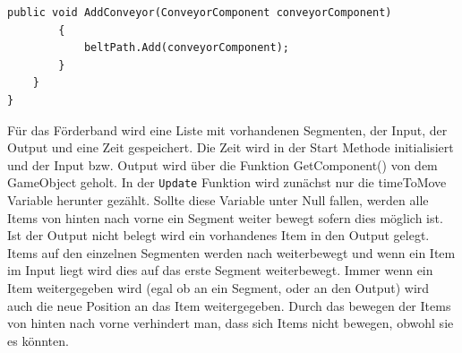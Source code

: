\documentclass[12pt, titlepage]{article}
\DeclareRobustCommand{\#}{\adjustbox{valign=B,totalheight=.57\baselineskip}{\oldhash}}%
\begin{document}
\begin{lstlisting}[style=code, caption={Förderband Komponente OOP}]
        public void AddConveyor(ConveyorComponent conveyorComponent)
        {
            beltPath.Add(conveyorComponent);
        }
    }
}
\end{lstlisting}
Für das Förderband wird eine Liste mit vorhandenen Segmenten, der Input, der Output und eine Zeit gespeichert. Die Zeit wird in der Start Methode initialisiert und der Input bzw. Output wird über die Funktion \glqq GetComponent()\grqq{} von dem GameObject geholt. In der \texttt{Update} Funktion wird zunächst nur die timeToMove Variable herunter gezählt. Sollte diese Variable unter Null fallen, werden alle Items von hinten nach vorne ein Segment weiter bewegt sofern dies möglich ist. Ist der Output nicht belegt wird ein vorhandenes Item in den Output gelegt. Items auf den einzelnen Segmenten werden nach weiterbewegt und wenn ein Item im Input liegt wird dies auf das erste Segment weiterbewegt. Immer wenn ein Item weitergegeben wird (egal ob an ein Segment, oder an den Output) wird auch die neue Position an das Item weitergegeben. Durch das bewegen der Items von hinten nach vorne verhindert man, dass sich Items nicht bewegen, obwohl sie es könnten.
\end{document}
